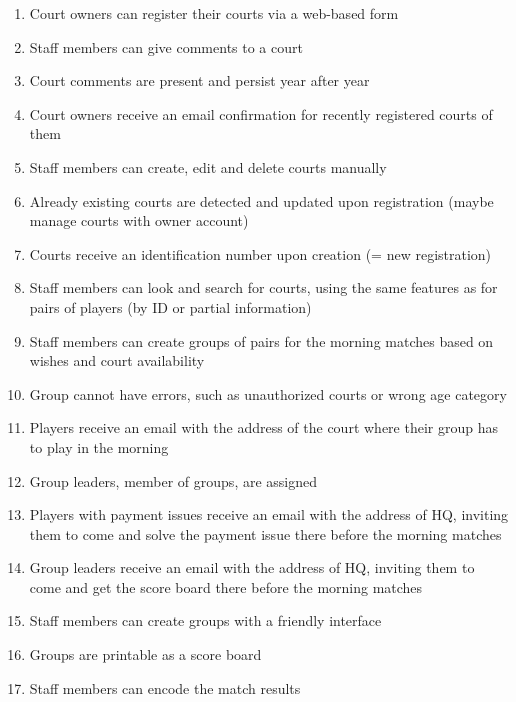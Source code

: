 \begin{enumerate}
    \item Court owners can register their courts via a web-based form
    \item Staff members can give comments to a court
    \item Court comments are present and persist year after year
    \item Court owners receive an email confirmation for recently
        registered courts of them
    \item Staff members can create, edit and delete courts manually
\color{red!80!black}
    \item Already existing courts are detected and updated upon
        registration (maybe manage courts with owner account)
\color{green!60!black}
    \item Courts receive an identification number upon creation (= new
        registration)
\color{red!80!black}
    \item Staff members can look and search for courts, using the same
        features as for pairs of players (by ID or partial information)
\color{orange!80!black}
    \item Staff members can create groups of pairs for the morning
        matches based on wishes and court availability
\color{red!80!black}
    \item Group cannot have errors, such as unauthorized courts or wrong
        age category
    \item Players receive an email with the address of the court where
        their group has to play in the morning
\color{orange!80!black}
    \item Group leaders, member of groups, are assigned
\color{red!80!black}
    \item Players with payment issues receive an email with the address
        of HQ, inviting them to come and solve the payment issue there
        before the morning matches
    \item Group leaders receive an email with the address of HQ,
        inviting them to come and get the score board there before the
        morning matches
\color{orange!80!black}
    \item Staff members can create groups with a friendly interface
\color{red!80!black}
    \item Groups are printable as a score board
    \item Staff members can encode the match results
\end{enumerate}

